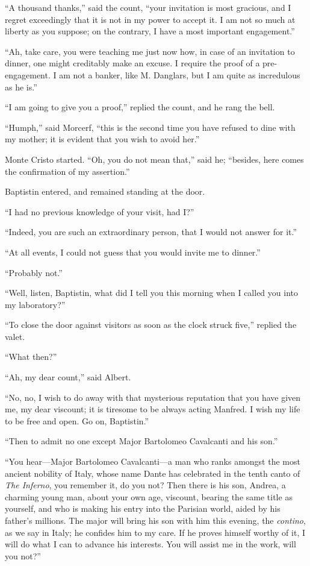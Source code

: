 “A thousand thanks,” said the count, “your invitation is most gracious,
and I regret exceedingly that it is not in my power to accept it. I am
not so much at liberty as you suppose; on the contrary, I have a most
important engagement.”

“Ah, take care, you were teaching me just now how, in case of an
invitation to dinner, one might creditably make an excuse. I require
the proof of a pre-engagement. I am not a banker, like M. Danglars, but
I am quite as incredulous as he is.”

“I am going to give you a proof,” replied the count, and he rang the
bell.

“Humph,” said Morcerf, “this is the second time you have refused to
dine with my mother; it is evident that you wish to avoid her.”

Monte Cristo started. “Oh, you do not mean that,” said he; “besides,
here comes the confirmation of my assertion.”

Baptistin entered, and remained standing at the door.

“I had no previous knowledge of your visit, had I?”

“Indeed, you are such an extraordinary person, that I would not answer
for it.”

“At all events, I could not guess that you would invite me to dinner.”

“Probably not.”

“Well, listen, Baptistin, what did I tell you this morning when I
called you into my laboratory?”

“To close the door against visitors as soon as the clock struck five,”
replied the valet.

“What then?”

“Ah, my dear count,” said Albert.

“No, no, I wish to do away with that mysterious reputation that you
have given me, my dear viscount; it is tiresome to be always acting
Manfred. I wish my life to be free and open. Go on, Baptistin.”

“Then to admit no one except Major Bartolomeo Cavalcanti and his son.”

“You hear—Major Bartolomeo Cavalcanti—a man who ranks amongst the most
ancient nobility of Italy, whose name Dante has celebrated in the tenth
canto of \textit{The Inferno}, you remember it, do you not? Then there is his
son, Andrea, a charming young man, about your own age, viscount,
bearing the same title as yourself, and who is making his entry into
the Parisian world, aided by his father’s millions. The major will
bring his son with him this evening, the \textit{contino}, as we say in Italy;
he confides him to my care. If he proves himself worthy of it, I will
do what I can to advance his interests. You will assist me in the work,
will you not?”

